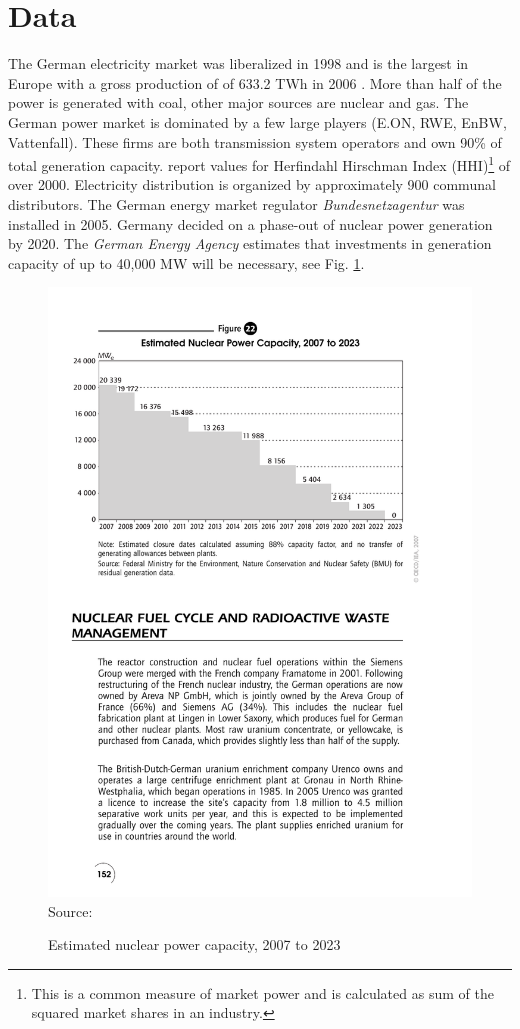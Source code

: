 \section{Data}

The German electricity market was liberalized in 1998 and is the largest in Europe with a gross production of of 633.2 TWh in 2006 \citep{IEA2007}. More than half of the power is generated with coal, other major sources are nuclear and gas. The German power market is dominated by a few large players (E.ON, RWE, EnBW, Vattenfall). These firms are both transmission system operators and own 90\% of total generation capacity. \cite{Brunekreeft2006} report values for Herfindahl Hirschman Index (HHI)\footnote{This is a common measure of market power and is calculated as sum of the squared market shares in an industry.} of over 2000. Electricity distribution is organized by approximately 900 communal distributors. The German energy market regulator  \emph{Bundesnetzagentur} was installed in 2005. Germany decided on a phase-out of nuclear power generation by 2020. The \emph{German Energy Agency} estimates that investments in generation capacity of up to 40,000 MW will be necessary, see Fig. \ref{fig:nuclear}.

\begin{figure}[htb]
  \centering
\caption{Estimated nuclear power capacity, 2007 to 2023}
  \includegraphics[width=.7\textwidth]{germandata/nuclear.pdf}
  \label{fig:nuclear}
\\
 \scriptsize Source: \cite{IEA2007a}
\end{figure}

